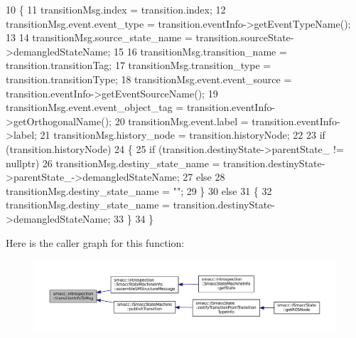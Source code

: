 \begin{DoxyCode}
10 \{
11     transitionMsg.index = transition.index;
12     transitionMsg.event.event\_type = transition.eventInfo->getEventTypeName();
13 
14     transitionMsg.source\_state\_name = transition.sourceState->demangledStateName;
15 
16     transitionMsg.transition\_name = transition.transitionTag;
17     transitionMsg.transition\_type = transition.transitionType;
18     transitionMsg.event.event\_source = transition.eventInfo->getEventSourceName();
19     transitionMsg.event.event\_object\_tag = transition.eventInfo->getOrthogonalName();
20     transitionMsg.event.label = transition.eventInfo->label;
21     transitionMsg.history\_node = transition.historyNode;
22 
23     \textcolor{keywordflow}{if} (transition.historyNode)
24     \{
25         \textcolor{keywordflow}{if} (transition.destinyState->parentState\_ != \textcolor{keyword}{nullptr})
26             transitionMsg.destiny\_state\_name = transition.destinyState->parentState\_->demangledStateName;
27         \textcolor{keywordflow}{else}
28             transitionMsg.destiny\_state\_name = \textcolor{stringliteral}{""};
29     \}
30     \textcolor{keywordflow}{else}
31     \{
32         transitionMsg.destiny\_state\_name = transition.destinyState->demangledStateName;
33     \}
34 \}
\end{DoxyCode}
Here is the caller graph for this function\+:
\nopagebreak
\begin{figure}[H]
\begin{center}
\leavevmode
\includegraphics[width=350pt]{namespacesmacc_1_1introspection_a6c1b51c4d44fd5e41fe218f1ee150681_icgraph}
\end{center}
\end{figure}
